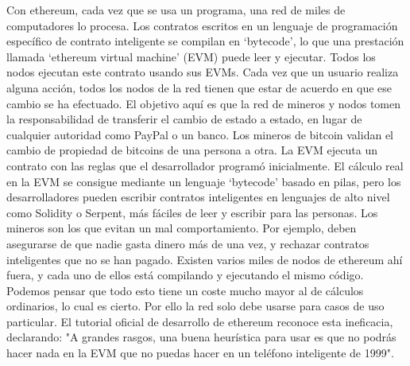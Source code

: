 Con ethereum, cada vez que se usa un programa, una red de miles de computadores lo procesa.
Los contratos escritos en un lenguaje de programación específico de contrato inteligente se
compilan en ‘bytecode’, lo que una prestación llamada ‘ethereum virtual machine’ (EVM) puede
leer y ejecutar.
Todos los nodos ejecutan este contrato usando sus EVMs.
Cada vez que un usuario realiza alguna acción, todos los nodos de la red tienen que estar de
acuerdo en que ese cambio se ha efectuado.
El objetivo aquí es que la red de mineros y nodos tomen la responsabilidad de transferir el cambio
de estado a estado, en lugar de cualquier autoridad como PayPal o un banco. Los mineros de
bitcoin validan el cambio de propiedad de bitcoins de una persona a otra. La EVM ejecuta un
contrato con las reglas que el desarrollador programó inicialmente.
El cálculo real en la EVM se consigue mediante un lenguaje ‘bytecode’ basado en pilas, pero los
desarrolladores pueden escribir contratos inteligentes en lenguajes de alto nivel como Solidity o
Serpent, más fáciles de leer y escribir para las personas.
Los mineros son los que evitan un mal comportamiento. Por ejemplo, deben asegurarse de que
nadie gasta dinero más de una vez, y rechazar contratos inteligentes que no se han pagado.
Existen varios miles de nodos de ethereum ahí fuera, y cada uno de ellos está compilando y
ejecutando el mismo código.
Podemos pensar que todo esto tiene un coste mucho mayor al de cálculos ordinarios, lo cual es
cierto. Por ello la red solo debe usarse para casos de uso particular.
El tutorial oficial de desarrollo de ethereum reconoce esta ineficacia, declarando:
"A grandes rasgos, una buena heurística para usar es que no podrás hacer nada en la EVM que
no puedas hacer en un teléfono inteligente de 1999".

